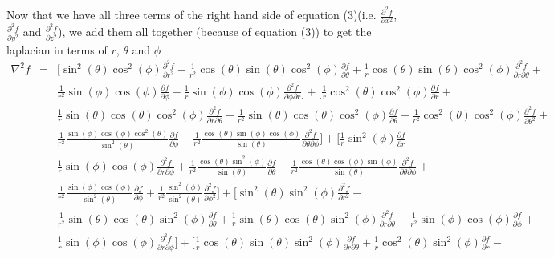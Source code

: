 \documentclass[12pt]{article}
\begin{document}
Now that we have all three terms of the right hand side of equation (3)(i.e. $\frac{{\partial}^2 f}{\partial x^2}$, $\frac{{\partial}^2 f}{\partial y^2}$ and $\frac{{\partial}^2 f}{\partial z^2}$), we add them all together (because of equation (3)) to get the laplacian in terms of $r$, $\theta$ and $\phi$ 
\begin{eqnarray*}
{\nabla}^2 f &=& \Big[{\sin}^2(\theta){\cos}^2(\phi)\frac{{\partial}^2 f}{\partial r^2} - \frac{1}{r^2}\cos(\theta)\sin(\theta){\cos}^2(\phi)\frac{\partial f}{\partial\theta} + \frac{1}{r}\cos(\theta)\sin(\theta){\cos}^2(\phi)\frac{{\partial}^2 f}{\partial r \partial\theta} + \\
& & \frac{1}{r^2}\sin(\phi)\cos(\phi)\frac{\partial f}{\partial\phi} - \frac{1}{r}\sin(\phi)\cos(\phi)\frac{{\partial}^2 f}{\partial\phi\partial r}\Big] + \Big[\frac{1}{r}{\cos}^2(\theta){\cos}^2(\phi)\frac{\partial f}{\partial r}
+ \\
& & \frac{1}{r}\sin(\theta)\cos(\theta){\cos}^2(\phi)\frac{{\partial}^2 f}{\partial r\partial\theta} - \frac{1}{r^2}\sin(\theta)\cos(\theta){\cos}^2(\phi)\frac{\partial f}{\partial\theta} + \frac{1}{r^2}{\cos}^2(\theta){\cos}^2(\phi)\frac{{\partial}^2 f}{\partial{\theta}^2} + \\
& & \frac{1}{r^2}\frac{\sin(\phi)\cos(\phi){\cos}^2(\theta)}{{\sin}^2(\theta)}\frac{\partial f}{\partial\phi} - \frac{1}{r^2}\frac{\cos(\theta)\sin(\phi)\cos(\phi)}{\sin(\theta)}\frac{{\partial}^2 f}{\partial\theta\partial\phi}\Big] + \Big[\frac{1}{r}{\sin}^2(\phi)\frac{\partial f}{\partial r} - \\ 
& & \frac{1}{r}\sin(\phi)\cos(\phi)\frac{{\partial}^2 f}{\partial r\partial\phi} + \frac{1}{r^2}\frac{\cos(\theta){\sin}^2(\phi)}{\sin(\theta)}\frac{\partial f}{\partial\theta} - \frac{1}{r^2}\frac{\cos(\theta)\cos(\phi)\sin(\phi)}{\sin(\theta)}\frac{{\partial}^2 f}{\partial\theta \partial\phi} + \\
& & \frac{1}{r^2}\frac{\sin(\phi)\cos(\phi)}{{\sin}^2(\theta)}\frac{\partial f}{\partial\phi} + \frac{1}{r^2}\frac{{\sin}^2(\phi)}{{\sin}^2(\theta)}\frac{{\partial}^2 f}{\partial{\phi}^2}\Big] + \Big[{\sin}^2(\theta){\sin}^2(\phi)\frac{{\partial}^2 f}{\partial r^2} - \\
& & \frac{1}{r^2}\sin(\theta)\cos(\theta){\sin}^2(\phi)\frac{\partial f}{\partial\theta} + \frac{1}{r}\sin(\theta)\cos(\theta){\sin}^2(\phi)\frac{{\partial}^2 f}{\partial r\partial\theta} - \frac{1}{r^2}\sin(\phi)\cos(\phi)\frac{\partial f}{\partial\phi} + \\
& & \frac{1}{r}\sin(\phi)\cos(\phi)\frac{{\partial}^2 f}{\partial r\partial\phi}\Big] + \Big[\frac{1}{r}\cos(\theta)\sin(\theta){\sin}^2(\phi)\frac{\partial f}{\partial r\partial\theta} + \frac{1}{r}{\cos}^2(\theta){\sin}^2(\phi)\frac{\partial f}{\partial r} - \\

\end{eqnarray*}
\end{document}
